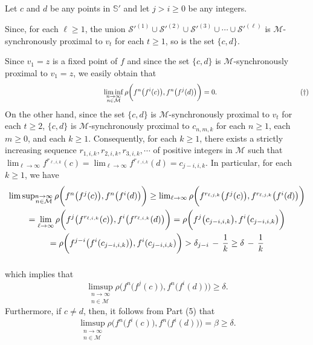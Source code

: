 \documentclass[12pt]{article}
\begin{document}
Let $c$ and $d$ be any points in $\mathbb S'$ and let $j > i \ge 0$ be any integers.  

Since, for each $\ell \ge 1$, the union $\mathcal S'^{(1)} \cup \mathcal S'^{(2)} \cup \mathcal S'^{(3)} \cup \cdots \cup \mathcal S'^{(\ell)}$
is $\mathcal M$-synchronously proximal to $v_t$ for each $t \ge 1$, so is the set $\{ c, d \}$.  

Since $v_1 = z$ is a fixed point of $f$ and since the set $\{ c, d \}$ is $\mathcal M$-synchronously proximal to $v_1 = z$, we easily obtain that 
$$
\quad\qquad\qquad\qquad\qquad\qquad\qquad\quad \liminf_{\substack{n \to \infty \\ n \in \mathcal M}} \rho\bigg(f^n\big(f^i(c)\big), f^n\big(f^j(d)\big)\bigg) = 0. \,\,\,\,\,\quad\qquad\qquad\qquad\qquad\qquad (\dagger) \vspace{.1in}
$$
\indent On the other hand, since the set $\{ c, d \}$ is $\mathcal M$-synchronously proximal to $v_t$ for each $t \ge 2$, $\{ c, d \}$ is $\mathcal M$-synchronously proximal to $c_{n,m,k}$ for each $n \ge 1$, each $m \ge 0$, and each $k \ge 1$.  Consequently, for each $k \ge 1$, there exists a strictly increasing sequence $r_{1,i,k}, r_{2,i,k}, r_{3,i,k}, \cdots$ of positive integers in $\mathcal M$ such that $\lim_{\ell \to \infty} f^{r_{\ell,i,k}}(c) = \lim_{\ell \to \infty} f^{r_{\ell,i,k}}(d) = c_{j-i, i,k}$.  In particular, for each $k \ge 1$, we have    
\begin{multline*}
$$
\limsup_{\substack{n \to \infty \\ n \in \mathcal M}} \rho\bigg(f^n\big(f^j(c)\big), f^n\big(f^i(d)\big)\bigg) \ge \lim_{\ell \to \infty} \rho\bigg(f^{r_{\ell,j,k}}\big(f^j(c)\big), f^{r_{\ell,j,k}}\big(f^i(d)\big)\bigg) \\
= \lim_{\ell \to \infty} \rho\bigg(f^j\big(f^{r_{\ell,i,k}}(c)\big), f^i\big(f^{r_{\ell,i,k}}(d)\big)\bigg)  
= \rho\bigg(f^j\big(c_{j-i,i,k}\big), f^i\big(c_{j-i,i,k}\big)\bigg) \\
= \rho\bigg(f^{j-i}\big(f^i(c_{j-i,i,k})\big), f^i(c_{j-i,i,k})\bigg) > \delta_{j-i} \, - \, \frac 1k \ge \delta \, - \, \frac 1k\vspace{.15in}
$$
\end{multline*}
which implies that 
$$
\limsup_{\substack{n \to \infty \\ n \in \mathcal M}} \rho\bigg(f^n\big(f^j(c)\big), f^n\big(f^i(d)\big)\bigg) \ge \delta.
$$
\indent Furthermore, if $c \ne d$, then, it follows from Part (5) that
$$
\limsup_{\substack{n \to \infty \\ n \in \mathcal M}} \rho\bigg(f^n\big(f^i(c)\big), f^n\big(f^i(d)\big)\bigg) = \beta \ge \delta.
$$
\end{document}
